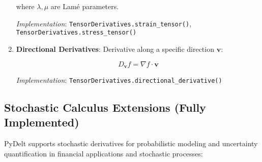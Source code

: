 \documentclass[10pt,journal,compsoc]{IEEEtran}
\begin{document}
\begin{enumerate}
    where $\lambda, \mu$ are Lamé parameters.
    
    
    \textit{Implementation}: \texttt{TensorDerivatives.strain\_tensor()}, \texttt{TensorDerivatives.stress\_tensor()}
    
    \item \textbf{Directional Derivatives}: Derivative along a specific direction $\mathbf{v}$:
    
    \begin{equation}
        D_{\mathbf{v}}f = \nabla f \cdot \mathbf{v}
    \end{equation}
    
    
    \textit{Implementation}: \texttt{TensorDerivatives.directional\_derivative()}
\end{enumerate}

\subsection{Stochastic Calculus Extensions (Fully Implemented)}

PyDelt supports stochastic derivatives for probabilistic modeling and uncertainty quantification in financial applications and stochastic processes:
\end{document}
